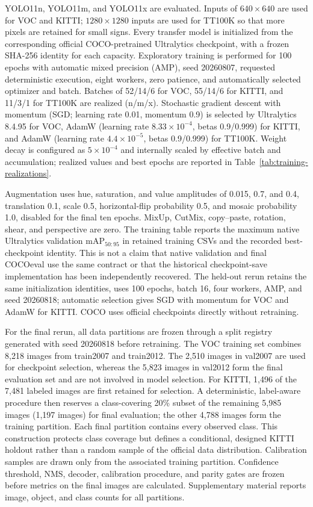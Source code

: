 \documentclass[10pt]{article}
\begin{document}
YOLO11n, YOLO11m, and YOLO11x are evaluated. Inputs of $640\times640$ are used for VOC and KITTI; $1280\times1280$ inputs are used for TT100K so that more pixels are retained for small signs. Every transfer model is initialized from the corresponding official COCO-pretrained Ultralytics checkpoint, with a frozen SHA-256 identity for each capacity. Exploratory training is performed for 100 epochs with automatic mixed precision (AMP), seed 20260807, requested deterministic execution, eight workers, zero patience, and automatically selected optimizer and batch. Batches of 52/14/6 for VOC, 55/14/6 for KITTI, and 11/3/1 for TT100K are realized (n/m/x). Stochastic gradient descent with momentum (SGD; learning rate 0.01, momentum 0.9) is selected by Ultralytics 8.4.95 for VOC, AdamW (learning rate $8.33\times10^{-4}$, betas 0.9/0.999) for KITTI, and AdamW (learning rate $4.4\times10^{-5}$, betas 0.9/0.999) for TT100K. Weight decay is configured as $5\times10^{-4}$ and internally scaled by effective batch and accumulation; realized values and best epochs are reported in Table~\ref{tab:training-realizations}.

Augmentation uses hue, saturation, and value amplitudes of 0.015, 0.7, and 0.4, translation 0.1, scale 0.5, horizontal-flip probability 0.5, and mosaic probability 1.0, disabled for the final ten epochs. MixUp, CutMix, copy--paste, rotation, shear, and perspective are zero. The training table reports the maximum native Ultralytics validation mAP$_{50:95}$ in retained training CSVs and the recorded best-checkpoint identity. This is not a claim that native validation and final COCOeval use the same contract or that the historical checkpoint-save implementation has been independently recovered. The held-out rerun retains the same initialization identities, uses 100 epochs, batch 16, four workers, AMP, and seed 20260818; automatic selection gives SGD with momentum for VOC and AdamW for KITTI. COCO uses official checkpoints directly without retraining.

For the final rerun, all data partitions are frozen through a split registry generated with seed 20260818 before retraining. The VOC training set combines 8,218 images from train2007 and train2012. The 2,510 images in val2007 are used for checkpoint selection, whereas the 5,823 images in val2012 form the final evaluation set and are not involved in model selection. For KITTI, 1,496 of the 7,481 labeled images are first retained for selection. A deterministic, label-aware procedure then reserves a class-covering 20\% subset of the remaining 5,985 images (1,197 images) for final evaluation; the other 4,788 images form the training partition. Each final partition contains every observed class. This construction protects class coverage but defines a conditional, designed KITTI holdout rather than a random sample of the official data distribution. Calibration samples are drawn only from the associated training partition. Confidence threshold, NMS, decoder, calibration procedure, and parity gates are frozen before metrics on the final images are calculated. Supplementary material reports image, object, and class counts for all partitions.
\end{document}
